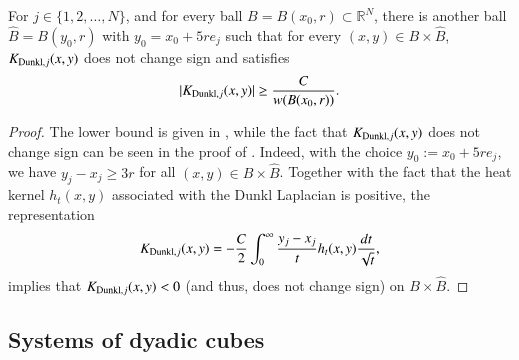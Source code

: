 \documentclass[12pt]{amsart}
\begin{document}
\begin{lemma}\label{nondegenerate}
For $j\in\{1,2,\ldots,N\}$, and for every ball $B=B(x_0,r)\subset \mathbb{R}^N$, there is another ball $\widehat{B}=B(y_0,r)$ with $y_0=x_0+5re_j$ such that for every $(x,y)\in B\times \widehat{B}$, $K_{{\rm Dunkl},j}(x,y)$ does not change sign and satisfies
\begin{align*}
|K_{{\rm Dunkl},j}(x,y)|\geq\frac{C}{w(B(x_0,r))}.
\end{align*}
\end{lemma}
\begin{proof}
The lower bound is given in \cite[Theorem 1.2]{MR4733961}, while the fact that $K_{{\rm Dunkl},j}(x,y)$ does not change sign can be seen in the proof of \cite[Theorem 1.2]{MR4733961}. Indeed, with the choice $y_0:=x_0+5re_j$, we have $y_j-x_j\geq 3r$ for all $(x,y)\in B\times \widehat{B}$. Together with the fact that the heat kernel $h_t(x,y)$ associated with the Dunkl Laplacian is  positive, the representation
$$K_{{\rm Dunkl},j}(x,y)=-\frac{C}{2}\int_0^\infty \frac{y_j-x_j}{t}h_t(x,y)\frac{dt}{\sqrt{t}},$$
implies that $K_{{\rm Dunkl},j}(x,y)<0$ (and thus, does not change sign) on $ B\times \widehat{B}$.
\end{proof}



\subsection{Systems of dyadic cubes}
\end{document}
